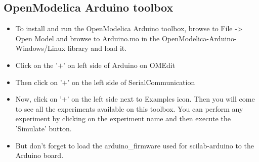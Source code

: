 \subsection{OpenModelica Arduino toolbox}

\begin{itemize}
      \item To install and run the OpenModelica Arduino toolbox, browse to
            File -> Open Model and browse to Arduino.mo in the OpenModelica-Arduino-Windows/Linux library and load it.
      \item Click on the '$+$' on left side of Arduino on OMEdit
      \item Then click on '$+$' on the left side of SerialCommunication
      \item Now, click on '$+$' on the left side next to Examples icon. Then you will come to see all
            the experiments available on this toolbox. You can perform any experiment by clicking on the experiment
            name and then execute the 'Simulate' button. 
      \item But don't forget to load the arduino\_firmware used for scilab-arduino to the Arduino board.
\end{itemize}



 





